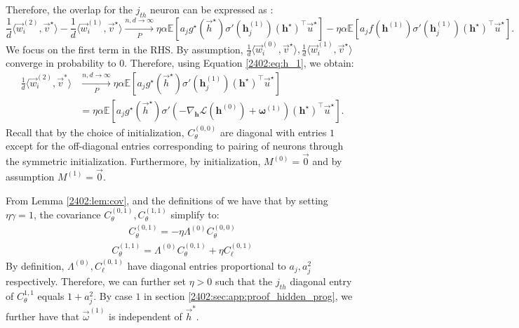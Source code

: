 Therefore, the overlap for the $j_{th}$ neuron can be expressed as : 
\begin{equation}\label{2402:eq:overlap}
    \frac{1}{d} \langle \vec{w}^{(2)}_i, \vec{v}^\star \rangle -  \frac{1}{d} \langle \vec{w}^{(1)}_i, \vec{v}^\star \rangle \xrightarrow[P]{n,d \rightarrow \infty} \eta \alpha
    \mathbb{E}\left[a_jg^\star(\vec{h}^\star)\sigma'(\boldsymbol{h}^{(1)}_j)\left( \boldsymbol{h}^\star \right)^\top\vec{u}^\star\right]-  \eta \alpha\mathbb{E}\left[a_jf(\boldsymbol{h}^{(1)})\sigma'(\boldsymbol{h}^{(1)}_j)\left( \boldsymbol{h}^\star \right)^\top\vec{u}^\star\right].
\end{equation}
We focus on the first term in the RHS.
By assumption, $\frac{1}{d} \langle \vec{w}^{(0)}_i, \vec{v}^\star \rangle ,\frac{1}{d} \langle \vec{w}^{(1)}_i, \vec{v}^\star \rangle $ converge in probability to $0$. Therefore, using Equation \eqref{2402:eq:h_1}, we obtain:
\begin{align}
   \frac{1}{d} \langle \vec{w}^{(2)}_i, \vec{v}^* \rangle &\xrightarrow[P]{n,d \rightarrow \infty}\eta \alpha
    \mathbb{E}\left[a_jg^\star(\vec{h}^\star)\sigma'(\boldsymbol{h}^{(1)}_j)\left( \boldsymbol{h}^\star \right)^\top\vec{u}^\star\right]\\ &= \eta \alpha
    \mathbb{E}\left[a_jg^\star(\vec{h}^\star)\sigma'(- \nabla_{\boldsymbol{h}} \mathcal{L}(\boldsymbol{h}^{(0)}) + \boldsymbol{\omega}^{(1)})\left( \boldsymbol{h}^\star \right)^\top\vec{u}^\star\right].
\end{align}
Recall that by the choice of initialization, $C_\theta^{(0,0)}$ are diagonal with entries $1$ except for the off-diagonal entries corresponding to pairing of neurons through the symmetric initialization. Furthermore, by initialization, $M^{(0)} = \vec{0}$ and by assumption $M^{(1)} = \vec{0}$.
 
From Lemma \ref{2402:lem:cov}, and the definitions of  we have that by setting $\eta\gamma=1$, 
the covariance $C_\theta^{(0,1)},C_\theta^{(1,1)}$ simplify to:
\begin{align}
    C_\theta^{(0,1)} =  - \eta  \Lambda^{(0)}C_\theta^{(0,0)}
\end{align}
\begin{align}
    C_\theta^{(1,1)} =   \Lambda^{(0)}C_\theta^{(0,1)} + \eta C_\ell^{(0,1)}
\end{align}
By definition, $\Lambda^{(0)},C_\ell^{(0,1)}$ have diagonal entries proportional to $a_j,a_j^2$ respectively. Therefore, we can further set $\eta > 0$ such that the $j_{th}$ diagonal entry of $C^{1,1}_{\theta}$ equals $1+a^2_j$. By case $1$ in section \ref{2402:sec:app:proof_hidden_prog}, we further have that $\vec{\omega}^{(1)}$ is independent of $\vec{h}^*$.


